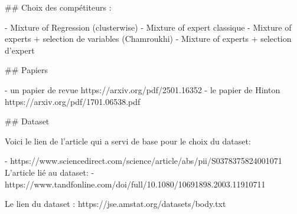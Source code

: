 ## Choix des compétiteurs :

- Mixture of Regression (clusterwise)
- Mixture of expert classique
- Mixture of experts + selection de variables (Chamroukhi)
- Mixture of experts + selection d'expert


## Papiers 

- un papier de revue  https://arxiv.org/pdf/2501.16352
- le papier de Hinton https://arxiv.org/pdf/1701.06538.pdf



## Dataset

Voici le lien de l'article qui a servi de base pour le choix du dataset: 

- https://www.sciencedirect.com/science/article/abs/pii/S0378375824001071
L'article lié au dataset: 
- https://www.tandfonline.com/doi/full/10.1080/10691898.2003.11910711

Le lien du dataset : https://jse.amstat.org/datasets/body.txt
